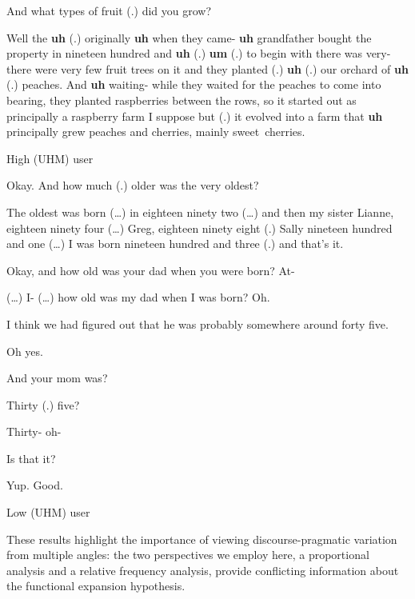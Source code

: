 \documentclass[11pt]{article}
\begin{document}
\begin{extract}[ht!]
    \begin{mdframed}[leftmargin=10pt,rightmargin=10pt]
        \begin{dialogue}

             And what types of fruit (.) did you grow?

             Well the \textbf{uh} (.) originally \textbf{uh} when they
            came- \textbf{uh} grandfather bought the property in nineteen hundred
            and \textbf{uh} (.) \textbf{um} (.) to begin with there was very- there
            were very few fruit trees on it and they planted (.) \textbf{uh} (.) our
            orchard of \textbf{uh} (.)  peaches. And \textbf{uh} waiting- while they
            waited for the peaches to come into bearing, they planted raspberries
            between the rows, so it started out as principally a raspberry farm I
            suppose but (.) it evolved into a farm that \textbf{uh} principally grew
            peaches and cherries, mainly sweet~cherries.
        \end{dialogue}
    \end{mdframed}
    \caption{High (UHM) user}\label{ext:highuhm}
\end{extract}

\begin{extract}[ht!]
    \begin{mdframed}[leftmargin=10pt,rightmargin=10pt]
        \begin{dialogue}

             Okay. And how much (.) older was the very oldest?

             The oldest was born (\ldots) in eighteen ninety two
            (\ldots) and then my sister Lianne, eighteen ninety four (\ldots)
            Greg, eighteen ninety eight (.) Sally nineteen hundred and one
            (\ldots) I was born nineteen hundred and three (.) and that's it.

             Okay, and how old was your dad when you were born? At-

             (\ldots) I- (\ldots) how old was my dad when I was born? Oh.

             I think we had figured out that he was probably
            somewhere around forty five.

             Oh yes.

             And your mom was?

             Thirty (.) five?

             Thirty- oh-

             Is that it?

             Yup. Good.

        \end{dialogue}
    \end{mdframed}
    \caption{Low (UHM) user}\label{ext:lowuhm}
\end{extract}

These results highlight the importance of viewing discourse-pragmatic variation
from multiple angles:
the two perspectives we employ here, a proportional analysis and a relative
frequency analysis, provide conflicting information about the functional
expansion hypothesis.

\printbibliography
\end{document}
